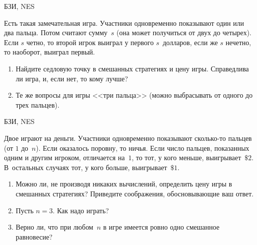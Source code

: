\begin{problem}
\begin{source}
БЗИ, NES
\end{source}
 Есть такая замечательная игра.
Участники одновременно показывают один или два пальца.
Потом считают сумму~$s$ (она может получиться от двух до
четырех). Если $s$ четно, то второй игрок выиграл у первого
$s$~долларов, если же $s$ нечетно, то наоборот, выиграл
первый.

\begin{enumerate}

\item Найдите седловую точку в смешанных стратегиях и цену
игры. Справедлива ли игра, и, если нет, то кому лучше?

\item Те же вопросы для игры <<три пальца>> (можно
выбрасывать от одного до трех пальцев).

\end{enumerate}



\begin{sol}

\end{sol}
\end{problem}




\begin{problem}
\begin{source}
БЗИ, NES
\end{source} Двое играют на
деньги. Участники одновременно показывают сколько-то
пальцев (от $1$ до~$n$). Если оказалось поровну, то ничья.
Если число пальцев, показанных одним и другим игроком,
отличается на~$1$, то тот, у кого меньше, выигрывает~$\$2$.
В~остальных случаях тот, у кого больше, выигрывает~$\$1$.

\begin{enumerate}

\item Можно ли, не производя никаких вычислений, определить
цену игры в смешанных стратегиях? Приведите соображения,
обосновывающие ваш ответ.

\item Пусть $n=3$. Как надо играть?

\item Верно ли, что при любом~$n$ в игре имеется ровно одно
смешанное равновесие?

\end{enumerate}

\begin{sol}

\end{sol}
\end{problem}





